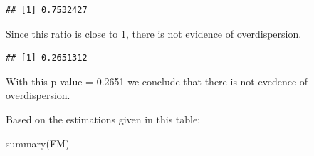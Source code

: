 \documentclass[
]{article}
\newenvironment{Shaded}{\begin{snugshade}}{\end{snugshade}}
\newcommand{\AttributeTok}[1]{\textcolor[rgb]{0.77,0.63,0.00}{#1}}
\newcommand{\CommentTok}[1]{\textcolor[rgb]{0.56,0.35,0.01}{\textit{#1}}}
\newcommand{\FloatTok}[1]{\textcolor[rgb]{0.00,0.00,0.81}{#1}}
\newcommand{\FunctionTok}[1]{\textcolor[rgb]{0.00,0.00,0.00}{#1}}
\newcommand{\NormalTok}[1]{#1}
\newcommand{\OtherTok}[1]{\textcolor[rgb]{0.56,0.35,0.01}{#1}}
\newcommand{\SpecialCharTok}[1]{\textcolor[rgb]{0.00,0.00,0.00}{#1}}
\begin{document}
\begin{Shaded}
\end{Shaded}

\begin{verbatim}
## [1] 0.7532427
\end{verbatim}

Since this ratio is close to 1, there is not evidence of overdispersion.

\begin{Shaded}
\end{Shaded}

\begin{verbatim}
## [1] 0.2651312
\end{verbatim}

With this p-value = 0.2651 we conclude that there is not evedence of
overdispersion.

Based on the estimations given in this table:

\begin{Shaded}
\begin{Highlighting}[]
\FunctionTok{summary}\NormalTok{(FM)}
\end{Highlighting}
\end{Shaded}
\end{document}
